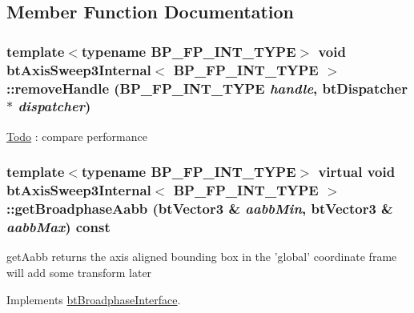 \subsection{Member Function Documentation}
\hypertarget{classbt_axis_sweep3_internal_4e26f4f8acf63f26451f6396223001bb}{
\subsubsection[removeHandle]{\setlength{\rightskip}{0pt plus 5cm}template$<$typename BP\_\-FP\_\-INT\_\-TYPE$>$ void {\bf btAxisSweep3Internal}$<$ BP\_\-FP\_\-INT\_\-TYPE $>$::removeHandle (BP\_\-FP\_\-INT\_\-TYPE {\em handle}, \/  {\bf btDispatcher} $\ast$ {\em dispatcher})}}
\label{classbt_axis_sweep3_internal_4e26f4f8acf63f26451f6396223001bb}




\begin{Desc}
\item[\hyperlink{todo__todo000008}{Todo}]: compare performance \end{Desc}
\hypertarget{classbt_axis_sweep3_internal_5f343e29ce818d0b96cb11260bca2a68}{
\subsubsection[getBroadphaseAabb]{\setlength{\rightskip}{0pt plus 5cm}template$<$typename BP\_\-FP\_\-INT\_\-TYPE$>$ virtual void {\bf btAxisSweep3Internal}$<$ BP\_\-FP\_\-INT\_\-TYPE $>$::getBroadphaseAabb (btVector3 \& {\em aabbMin}, \/  btVector3 \& {\em aabbMax}) const}}
\label{classbt_axis_sweep3_internal_5f343e29ce818d0b96cb11260bca2a68}


getAabb returns the axis aligned bounding box in the 'global' coordinate frame will add some transform later 

Implements \hyperlink{classbt_broadphase_interface_b5af9e26414f5a72a76040b8fab4d9e2}{btBroadphaseInterface}.

